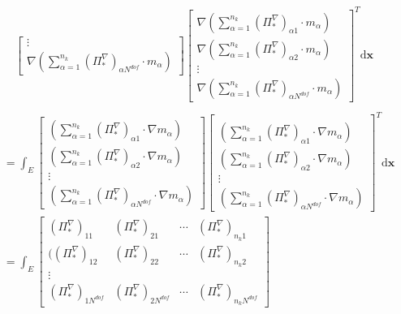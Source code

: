\begin{equation}
\begin{aligned}
\begin{bmatrix}
\vdots\\
\nabla(\sum_{\alpha = 1}^{n_k}(\Pi_{*}^{\nabla})_{\alpha N^{dof}}\cdot m_{\alpha})
\end{bmatrix}\begin{bmatrix} 
\nabla(\sum_{\alpha = 1}^{n_k}(\Pi_{*}^{\nabla})_{\alpha 1}\cdot m_{\alpha})\\ 
\nabla(\sum_{\alpha = 1}^{n_k}(\Pi_{*}^{\nabla})_{\alpha 2}\cdot m_{\alpha}) \\ 
\vdots\\
\nabla(\sum_{\alpha = 1}^{n_k}(\Pi_{*}^{\nabla})_{\alpha N^{dof}}\cdot m_{\alpha})
\end{bmatrix}^T\mathrm d \mathbf x\\
\end{aligned}
\end{equation}
\begin{equation*}
    \begin{aligned}
& = \int_E \begin{bmatrix} 
(\sum_{\alpha = 1}^{n_k}(\Pi_{*}^{\nabla})_{\alpha 1}\cdot \nabla m_{\alpha})\\ 
(\sum_{\alpha = 1}^{n_k}(\Pi_{*}^{\nabla})_{\alpha 2}\cdot \nabla m_{\alpha}) \\ 
\vdots\\
(\sum_{\alpha = 1}^{n_k}(\Pi_{*}^{\nabla})_{\alpha N^{dof}}\cdot \nabla m_{\alpha})
\end{bmatrix}\begin{bmatrix} \\
(\sum_{\alpha = 1}^{n_k}(\Pi_{*}^{\nabla})_{\alpha 1}\cdot \nabla m_{\alpha})\\ 
(\sum_{\alpha = 1}^{n_k}(\Pi_{*}^{\nabla})_{\alpha 2}\cdot \nabla m_{\alpha}) \\ 
\vdots\\
(\sum_{\alpha = 1}^{n_k}(\Pi_{*}^{\nabla})_{\alpha N^{dof}}\cdot \nabla m_{\alpha})
\end{bmatrix}^T \mathrm d \mathbf x \\
& = \int_{E} \begin{bmatrix} 
(\Pi_{*}^{\nabla})_{1 1} & (\Pi_{*}^{\nabla})_{2 1} & \cdots  & (\Pi_{*}^{\nabla})_{n_k 1} \\ 
((\Pi_{*}^{\nabla})_{1 2} & (\Pi_{*}^{\nabla})_{2 2} & \cdots  & (\Pi_{*}^{\nabla})_{n_k 2} \\ 
\vdots\\
(\Pi_{*}^{\nabla})_{1 N^{dof}} & (\Pi_{*}^{\nabla})_{2 N^{dof}} & \cdots  & (\Pi_{*}^{\nabla})_{n_k N^{dof}}
\end{bmatrix}

\end{aligned}
\end{equation*}
